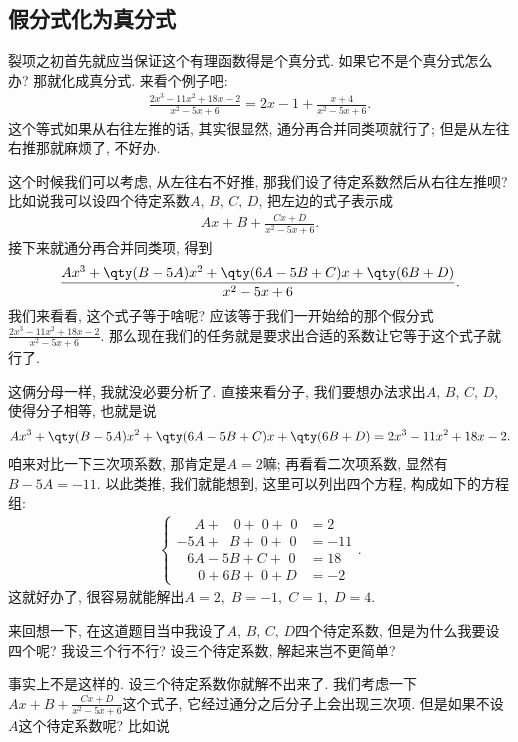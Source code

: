 \documentclass{ctexbook}
\begin{document}
{\subsection{假分式化为真分式}
裂项之初首先就应当保证这个有理函数得是个真分式. 如果它不是个真分式怎么办? 那就化成真分式. 来看个例子吧: 
\begin{align*}
\frac{2x^{3}-11x^{2}+18x-2}{x^{2}-5x+6}=2x-1+\frac{x+4}{x^{2}-5x+6}
.\end{align*}
这个等式如果从右往左推的话, 其实很显然, 通分再合并同类项就行了; 但是从左往右推那就麻烦了, 不好办. \par
这个时候我们可以考虑, 从左往右不好推, 那我们设了待定系数然后从右往左推呗? 比如说我可以设四个待定系数$A,\,B,\,C,\,D$, 把左边的式子表示成
\begin{align*}
Ax+B+\frac{Cx+D}{x^{2}-5x+6}
.\end{align*}
接下来就通分再合并同类项, 得到
\begin{align*}
\frac{Ax^{3}+\qty(B-5A)x^{2}+\qty(6A-5B+C)x+\qty(6B+D)}{x^{2}-5x+6}
.\end{align*}
我们来看看, 这个式子等于啥呢? 应该等于我们一开始给的那个假分式$\frac{2x^{3}-11x^{2}+18x-2}{x^{2}-5x+6}$. 那么现在我们的任务就是要求出合适的系数让它等于这个式子就行了. \par
这俩分母一样, 我就没必要分析了. 直接来看分子, 我们要想办法求出$A,\,B,\,C,\,D$, 使得分子相等, 也就是说
\begin{align*}
Ax^{3}+\qty(B-5A)x^{2}+\qty(6A-5B+C)x+\qty(6B+D)=2x^{3}-11x^{2}+18x-2
.\end{align*}
咱来对比一下三次项系数, 那肯定是$A=2$嘛; 再看看二次项系数, 显然有$B-5A=-11$. 以此类推, 我们就能想到, 这里可以列出四个方程, 构成如下的方程组: 
\begin{align*}
\begin{cases}
\quad\;A+\;\;\;0+\;0+\,\,0&=2\\
-5A+\;\:B+\;0+\,\,0&=-11\\
\;\;\:6A-5B+C+\,\,0&=18\\
\quad\;\;0+6B+\;0+D&=-2
\end{cases}
.\end{align*}
这就好办了, 很容易就能解出$A=2,\;B=-1,\;C=1,\;D=4$. \par
来回想一下, 在这道题目当中我设了$A,\,B,\,C,\,D$四个待定系数, 但是为什么我要设四个呢? 我设三个行不行? 设三个待定系数, 解起来岂不更简单? \par
事实上不是这样的. 设三个待定系数你就解不出来了. 我们考虑一下$Ax+B+\frac{Cx+D}{x^{2}-5x+6}$这个式子, 它经过通分之后分子上会出现三次项. 但是如果不设$A$这个待定系数呢? 比如说
}
\end{document}
